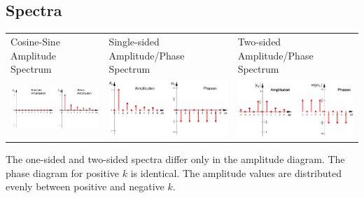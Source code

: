    \subsection{Spectra}
   	\begin{tabular}{p{5.6cm} p{6.6cm} p{6cm}}
		Cosine-Sine Amplitude Spectrum &
		Single-sided Amplitude/Phase Spectrum &
		Two-sided Amplitude/Phase Spectrum \\
   		\includegraphics[width=5cm]{Content/03_transforms/cosSinSpectr.png} &
   		\includegraphics[width=5cm]{Content/03_transforms/EinseitigSpectr.png} &
   		\includegraphics[width=5cm]{Content/03_transforms/ZweiseitigSpectr.png}
   	\end{tabular}
   	The one-sided and two-sided spectra differ only in the amplitude diagram.
	The phase diagram for positive $k$ is identical.
	The amplitude values are distributed evenly between positive and negative $k$.
